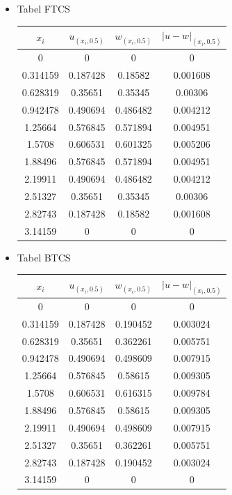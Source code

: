 \documentclass[paper=a4, fontsize=11pt]{scrartcl}
\numberwithin{equation}{section} %
\numberwithin{figure}{section} %
\numberwithin{table}{section} %
\begin{document}
\begin{itemize}
\item Tabel FTCS
\begin{table}[ht]
\begin{tabular}{c c c c}
\hline
$x_{i}$ & $u_{(x_{i}, 0.5)}$ & $w_{(x_{i}, 0.5)}$ & $\vert u - w \vert _{(x_{i}, 0.5)}$  \\ [0.5ex]
\hline 
0 & 0 & 0 & 0\\
0.314159 & 0.187428 & 0.18582 & 0.001608 \\
0.628319 & 0.35651 & 0.35345 & 0.00306 \\
0.942478 & 0.490694 & 0.486482 & 0.004212\\
1.25664 & 0.576845 & 0.571894 & 0.004951\\
1.5708 & 0.606531 & 0.601325 & 0.005206 \\
1.88496 & 0.576845 & 0.571894 & 0.004951 \\
2.19911 & 0.490694 & 0.486482 & 0.004212\\
2.51327 & 0.35651 & 0.35345 & 0.00306\\
2.82743 & 0.187428 & 0.18582 & 0.001608\\
3.14159 & 0 & 0 & 0\\ [1ex]
\hline 
\end{tabular}
\end{table}

\item Tabel BTCS
\begin{table}[ht]
\begin{tabular}{c c c c}
\hline
$x_{i}$ & $u_{(x_{i}, 0.5)}$ & $w_{(x_{i}, 0.5)}$ & $\vert u - w \vert _{(x_{i}, 0.5)}$  \\ [0.5ex]
\hline 
0	& 0	& 0	& 0 \\
0.314159	 & 0.187428 & 0.190452 &	 0.003024\\
0.628319 & 0.35651	& 0.362261 &	 0.005751\\
0.942478	 & 0.490694	& 0.498609 &	 0.007915\\
1.25664	& 0.576845 & 	0.58615 &	0.009305\\
1.5708	& 0.606531	 & 0.616315 &	0.009784\\
1.88496 &	0.576845 &	0.58615 &	0.009305\\
2.19911 &	0.490694	 & 0.498609 &	0.007915\\
2.51327 &	0.35651	& 0.362261 & 	0.005751\\
2.82743 & 0.187428 & 	0.190452	 & 0.003024\\
3.14159 &	0	& 0 &	0 \\[1ex]
\hline 
\end{tabular}
\end{table}


\end{itemize}
\end{document}
